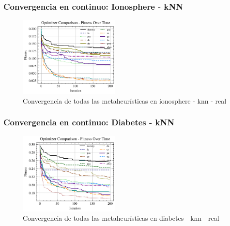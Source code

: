 \begin{frame}
    \frametitle{Convergencia en continuo: Ionosphere - kNN}
    \begin{figure}[htp]
        \includegraphics[width=0.45\textwidth]{imagenes/chapter5/optimizers_fitness_knn_io.png}
        \caption{Convergencia de todas las metaheurísticas en ionosphere - knn - real}
    \end{figure}
\end{frame}
\begin{frame}
    \frametitle{Convergencia en continuo: Diabetes - kNN}
    \begin{figure}[htp]
        \includegraphics[width=0.45\textwidth]{imagenes/chapter5/optimizers_fitness_knn_dia.png}
        \caption{Convergencia de todas las metaheurísticas en diabetes - knn - real}
    \end{figure}
\end{frame}



